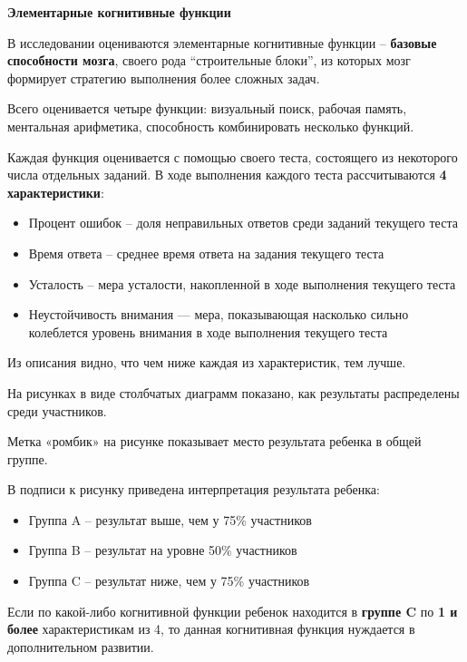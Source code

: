 \documentclass[10pt]{article}
\begin{document}
\newpage

\begin{center}
    \textbf{\large Элементарные когнитивные функции}
\end{center}

\vspace{1em}

В исследовании оцениваются элементарные когнитивные функции -- \textbf{базовые способности мозга}, своего рода ``строительные блоки'', из которых мозг формирует стратегию выполнения более сложных задач.

Всего оценивается четыре функции: визуальный поиск, рабочая память, ментальная арифметика, способность комбинировать несколько функций.

Каждая функция оценивается с помощью своего теста, состоящего из некоторого числа отдельных заданий. 
В ходе выполнения каждого теста рассчитываются \textbf{4 характеристики}:

\begin{itemize}
  \item Процент ошибок -- доля неправильных ответов среди заданий текущего теста
  \item Время ответа -- среднее время ответа на задания текущего теста
  \item Усталость -- мера усталости, накопленной в ходе выполнения текущего теста
  \item Неустойчивость внимания --- мера, показывающая насколько сильно колеблется уровень внимания в ходе выполнения текущего теста
\end{itemize}

Из описания видно, что чем ниже каждая из характеристик, тем лучше.
 
На рисунках в виде столбчатых диаграмм показано, как результаты распределены среди участников.

Метка «ромбик» на рисунке показывает место результата ребенка в общей группе.

В подписи к рисунку приведена интерпретация результата ребенка:

\begin{itemize}
  \item Группа A -- результат выше, чем у 75\% участников
  \item Группа B -- результат на уровне 50\% участников
  \item Группа C -- результат ниже, чем у 75\% участников
\end{itemize}

Если по какой-либо когнитивной функции ребенок находится в \textbf{группе C} по \textbf{1 и более} характеристикам из 4, то данная когнитивная функция нуждается в дополнительном развитии.
\end{document}
